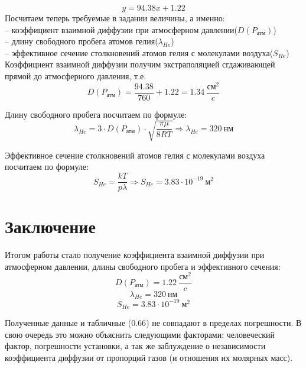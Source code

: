 \documentclass[a4paper,12pt]{article}
\begin{document}
\begin{equation}
	y = 94.38x + 1.22
\end{equation}
Посчитаем теперь требуемые в задании величины, а именно:\\
	-- коэффициент взаимной диффузии при атмосферном давлении($D(P_{\text{атм}})$) \\
	-- длину свободного пробега атомов гелия($\lambda_{He}$)\\
	-- эффективное сечение столкновений атомов гелия с молекулами воздуха($S_{He}$)\\
	
Коэффициент взаимной диффузии получим экстраполяцией сгдаживающей прямой до атмосферного давления, т.е.
\begin{equation}
	D(P_{\text{атм}}) = \frac{94.38}{760} + 1.22 = 1.34\ \frac{\text{см}^2}{c}
\end{equation}

Длину свободного пробега посчитаем по формуле:
\begin{equation}
	\lambda_{He} = 3\cdot D(P_{\text{атм}})\cdot \sqrt{\dfrac{\pi \mu}{8RT}} \Rightarrow  \lambda_{He} = 320\ \text{нм}
\end{equation}

Эффективное сечение столкновений атомов гелия с молекулами воздуха посчитаем по формуле:
\begin{equation}
	S_{He} = \frac{kT}{p\lambda} \Rightarrow S_{He} = 3.83 \cdot 10^{-19}\ \text{м}^2
\end{equation}

\section{Заключение}

Итогом работы стало получение коэффициента взаимной диффузии при атмосферном давлении, длины свободного пробега и эффективного сечения:
$$
D(P_{\text{атм}}) = 1.22~\frac{\text{см}^2}{c}
$$
$$
\lambda_{He} = 320~\text{нм}
$$
$$
S_{He} = 3.83\cdot 10^{-19}~\text{м}^2
$$ 
 
Полученные данные и табличные ($0.66$) не совпадают в пределах погрешности. В свою очередь это можно объяснить следующими факторами: человеческий фактор, погрешности установки, а так же заблуждение о независимости коэффициента диффузии от пропорций газов (и отношения их молярных масс).
\end{document}
